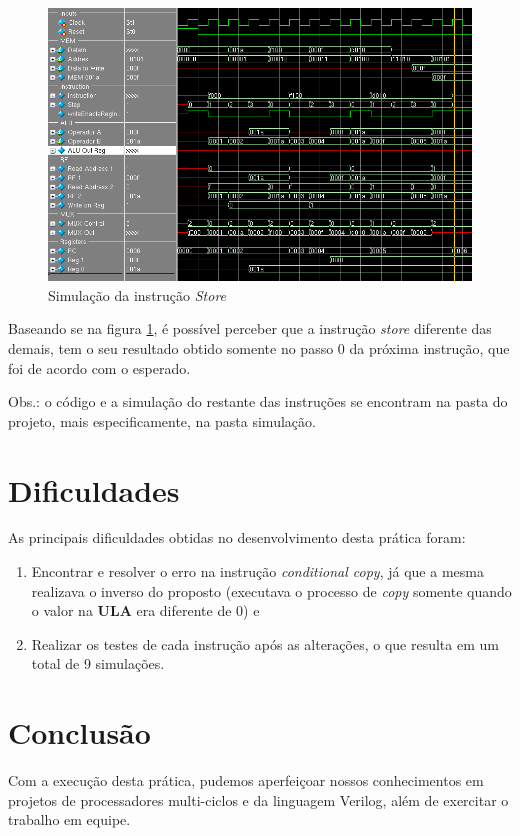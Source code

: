\documentclass[12pt, a4paper]{article}
\begin{document}
    \begin{figure}[!h]
    	\centering
    	\includegraphics[width=15cm]{./STORE/store}
    	\caption{Simulação da instrução \textit{Store}}
    	\label{fig: store}
    \end{figure}

    \par Baseando se na figura \ref{fig: store}, é possível perceber que a instrução \textit{store} diferente das demais, tem o seu resultado obtido somente no passo 0 da próxima instrução, que foi de acordo com o esperado.
    
    \vspace{\baselineskip}
    
    \par \noindent Obs.: o código e a simulação do restante das instruções se encontram na pasta do projeto, mais especificamente, na pasta simulação.
	
	\section{Dificuldades}
	
	\par As principais dificuldades obtidas no desenvolvimento desta prática foram:
	
	\begin{enumerate}
		\item Encontrar e resolver o erro na instrução \textit{conditional copy}, já que a mesma realizava o inverso do proposto (executava o processo de \textit{copy} somente quando o valor na \textbf{ULA} era diferente de 0) e

        \item Realizar os testes de cada instrução após as alterações, o que resulta em um total de 9 simulações.
	\end{enumerate}

	\section{Conclusão}
	
	\par Com a execução desta prática, pudemos aperfeiçoar nossos conhecimentos em projetos de processadores multi-ciclos e da linguagem Verilog, além de exercitar o trabalho em equipe.
\end{document}
